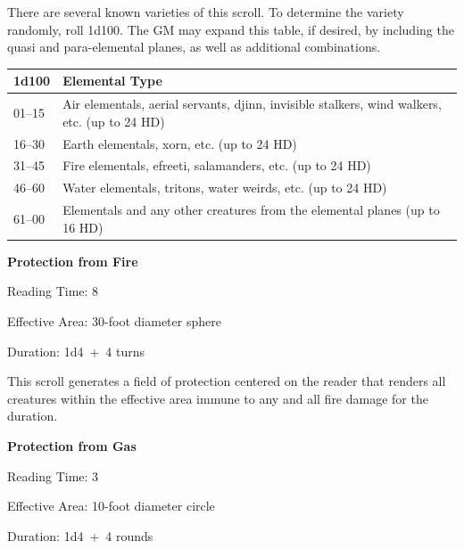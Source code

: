 \begin{multicols}{2}
There are several known varieties of this scroll.  To determine the variety randomly, roll 1d100.  The GM may expand this table, if desired, by including the quasi and para-elemental planes, as well as additional combinations.

\noindent
\begin{tabular}{|p{}|p{}|}
\hline
1d100	& Elemental Type \\
\hline\hline
\rowcolor[gray]{.9}01--15	& Air elementals, aerial servants, djinn, invisible stalkers, wind walkers, etc. (up to 24 HD) \\
16--30	& Earth elementals, xorn, etc. (up to 24 HD) \\
\rowcolor[gray]{.9}31--45	& Fire elementals, efreeti, salamanders, etc. (up to 24 HD) \\
46--60	& Water elementals, tritons, water weirds, etc. (up to 24 HD) \\
\rowcolor[gray]{.9}61--00	& Elementals and any other creatures from the elemental planes (up to 16 HD) \\
\hline
\end{tabular}

\vspace{1em}
\noindent \begin{minipage}{\columnwidth}

\noindent \textbf{Protection from Fire}

\noindent Reading Time: 8

\noindent Effective Area: 30-foot diameter sphere

\noindent Duration: 1d4~+~4 turns

\end{minipage}

This scroll generates a field of protection centered on the reader that renders all creatures within the effective area immune to any and all fire damage for the duration.

\columnbreak
 
\vspace{1em}
\noindent \begin{minipage}{\columnwidth}

\noindent \textbf{Protection from Gas}

\noindent Reading Time: 3

\noindent Effective Area: 10-foot diameter circle

\noindent Duration: 1d4~+~4 rounds

\end{minipage}


\end{multicols}
